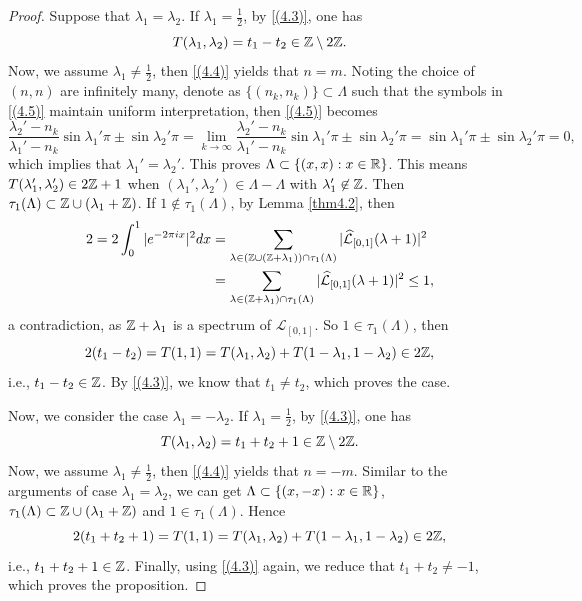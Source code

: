 \documentclass[10pt,a4paper]{amsart}
\begin{document}
\begin{proof}
Suppose that $\lambda_1=\lambda_2$. 
If $\lambda_1=\frac12$, by \eqref{(4.3)}, one has 
$$
T(\lambda_1,\lambda_2)=t_1-t_2\in\Bbb Z\setminus2\Bbb Z.
$$
Now, we assume $\lambda_1\neq\frac12$, then \eqref{(4.4)} yields that $n=m$. 
Noting the choice of $(n,n)$ are infinitely many, denote as $\{(n_k,n_k)\}\subset\Lambda$ such that the symbols in \eqref{(4.5)} maintain uniform interpretation, then \eqref{(4.5)} becomes  
$$
\frac{\lambda_2'-n_k}{\lambda_1'-n_k}\sin\lambda_1'\pi\pm\sin\lambda_2'\pi=\lim_{k\rightarrow\infty}\frac{\lambda_2'-n_k}{\lambda_1'-n_k}\sin\lambda_1'\pi\pm\sin\lambda_2'\pi=\sin\lambda_1'\pi\pm\sin\lambda_2'\pi=0,
$$
which implies that $\lambda_1'=\lambda_2'$. 
This proves $\Lambda\subset\{(x,x):x\in\Bbb R\}$. 
This means $T(\lambda_1',\lambda_2')\in2\Bbb Z+1$ when $(\lambda_1',\lambda_2')\in\Lambda-\Lambda$ with $\lambda_1'\not\in\Bbb Z$. 
Then $\tau_1(\Lambda)\subset\Bbb Z\cup(\lambda_1+\Bbb Z)$. 
If $1\not\in\tau_1(\Lambda)$, by Lemma \ref{thm4.2}, then 
\begin{align*}
	2=	2\int_0^1|e^{-2\pi i x}|^2dx&=\sum_{\lambda\in(\Bbb Z\cup(\Bbb Z+\lambda_1))\cap\tau_1(\Lambda)}|\widehat{\mathcal{L}}_{[0,1]}(\lambda+1)|^2
	\\
	&=\sum_{\lambda\in(\Bbb Z+\lambda_1)\cap\tau_1(\Lambda)}|\widehat{\mathcal{L}}_{[0,1]}(\lambda+1)|^2\leq 1,
\end{align*}
a contradiction, as $\Bbb Z+\lambda_1$ is a spectrum of $\mathcal{L}_{[0,1]}$. 
So $1\in\tau_1(\Lambda)$, then 
$$
2(t_1-t_2)=T(1,1)=T(\lambda_1,\lambda_2)+T(1-\lambda_1,1-\lambda_2)\in2\Bbb Z,
$$
i.e., $t_1-t_2\in\Bbb Z$. 
By \eqref{(4.3)}, we know that $t_1\neq t_2$, which proves the case. 

Now, we consider the case $\lambda_1=-\lambda_2$. 
If $\lambda_1=\frac12$, by \eqref{(4.3)}, one has 
$$
T(\lambda_1,\lambda_2)=t_1+t_2+1
\in\Bbb Z\setminus2\Bbb Z.
$$
Now, we assume $\lambda_1\neq\frac12$, then \eqref{(4.4)} yields that $n=-m$. 
Similar to the arguments of case $\lambda_1=\lambda_2$, we can get $\Lambda\subset\{(x,-x):x\in\Bbb R\}$,  $\tau_1(\Lambda)\subset\Bbb Z\cup(\lambda_1+\Bbb Z)$ and  $1\in\tau_1(\Lambda)$. 
Hence
$$
2(t_1+t_2+1)=T(1,1)=T(\lambda_1,\lambda_2)+T(1-\lambda_1,1-\lambda_2)\in2\Bbb Z,
$$
i.e., $t_1+t_2+1\in\Bbb Z$. 
Finally, using \eqref{(4.3)} again, we reduce  that $t_1+t_2\neq-1$, which proves the proposition. 
\end{proof}
\end{document}
